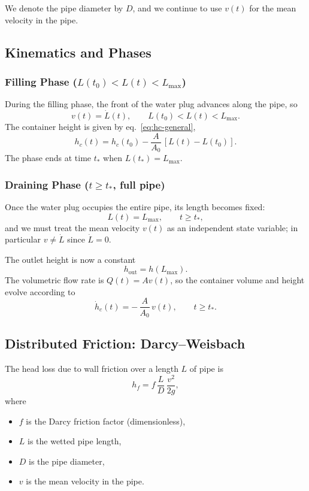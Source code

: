 \documentclass[11pt]{article}
\begin{document}
We denote the pipe diameter by $D$, and we continue to use $v(t)$ for the mean
velocity in the pipe.

\subsection{Kinematics and Phases}

\subsubsection*{Filling Phase ($L(t_0) < L(t) < L_{\max}$)}

During the filling phase, the front of the water plug advances along the pipe,
so
\begin{equation}
  v(t) = \dot L(t), \qquad L(t_0) < L(t) < L_{\max}.
\end{equation}
The container height is given by eq.~\eqref{eq:hc-general},
\[
h_c(t) = h_c(t_0) - \frac{A}{A_0}\,[L(t)-L(t_0)].
\]
The phase ends at time $t_\ast$ when $L(t_\ast) = L_{\max}$.

\subsubsection*{Draining Phase ($t \ge t_\ast$, full pipe)}

Once the water plug occupies the entire pipe, its length becomes fixed:
\[
L(t) = L_{\max}, \qquad t \ge t_\ast,
\]
and we must treat the mean velocity $v(t)$ as an independent state variable;
in particular $v \neq \dot L$ since $\dot L = 0$.

The outlet height is now a constant
\[
h_{\text{out}} = h(L_{\max}).
\]
The volumetric flow rate is $Q(t) = A v(t)$, so the container volume and height
evolve according to
\begin{equation}
  \dot h_c(t) = -\,\frac{A}{A_0}\,v(t),
  \qquad t \ge t_\ast.
  \label{eq:hc-draining}
\end{equation}

\subsection{Distributed Friction: Darcy--Weisbach}

The head loss due to wall friction over a length $L$ of pipe is
\cite{white_fm,crane}
\begin{equation}
  h_f = f\,\frac{L}{D}\,\frac{v^2}{2g},
\end{equation}
where
\begin{itemize}
  \item $f$ is the Darcy friction factor (dimensionless),
  \item $L$ is the wetted pipe length,
  \item $D$ is the pipe diameter,
  \item $v$ is the mean velocity in the pipe.
\end{itemize}
\end{document}
